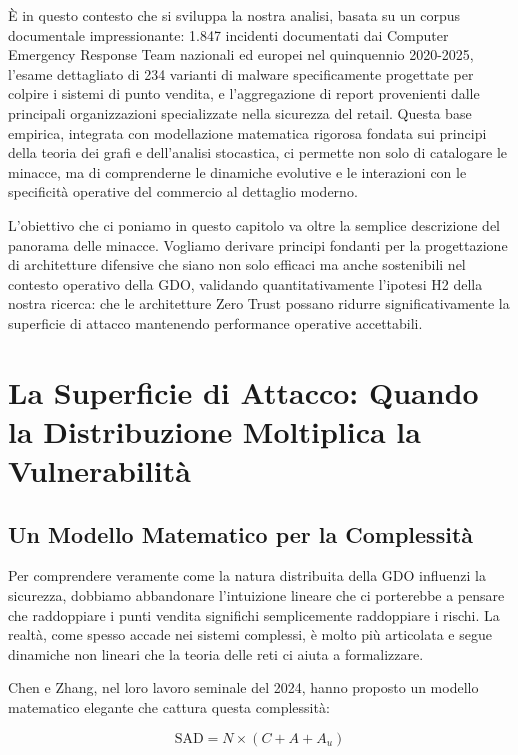 È in questo contesto che si sviluppa la nostra analisi, basata su un corpus documentale impressionante: 1.847 incidenti documentati dai Computer Emergency Response Team nazionali ed europei nel quinquennio 2020-2025\autocite{enisa2024threat,verizon2024}, l'esame dettagliato di 234 varianti di malware specificamente progettate per colpire i sistemi di punto vendita\autocite{groupib2024}, e l'aggregazione di report provenienti dalle principali organizzazioni specializzate nella sicurezza del retail. Questa base empirica, integrata con modellazione matematica rigorosa fondata sui principi della teoria dei grafi e dell'analisi stocastica, ci permette non solo di catalogare le minacce, ma di comprenderne le dinamiche evolutive e le interazioni con le specificità operative del commercio al dettaglio moderno.

L'obiettivo che ci poniamo in questo capitolo va oltre la semplice descrizione del panorama delle minacce. Vogliamo derivare principi fondanti per la progettazione di architetture difensive che siano non solo efficaci ma anche sostenibili nel contesto operativo della GDO, validando quantitativamente l'ipotesi H2 della nostra ricerca: che le architetture Zero Trust possano ridurre significativamente la superficie di attacco mantenendo performance operative accettabili.

\section{La Superficie di Attacco: Quando la Distribuzione Moltiplica la Vulnerabilità}

\subsection{Un Modello Matematico per la Complessità}

Per comprendere veramente come la natura distribuita della GDO influenzi la sicurezza, dobbiamo abbandonare l'intuizione lineare che ci porterebbe a pensare che raddoppiare i punti vendita significhi semplicemente raddoppiare i rischi. La realtà, come spesso accade nei sistemi complessi, è molto più articolata e segue dinamiche non lineari che la teoria delle reti ci aiuta a formalizzare.

Chen e Zhang, nel loro lavoro seminale del 2024\autocite{chen2024graph}, hanno proposto un modello matematico elegante che cattura questa complessità:

\begin{equation}
\text{SAD} = N \times (C + A + A_u)
\label{eq:sad_model}
\end{equation}


